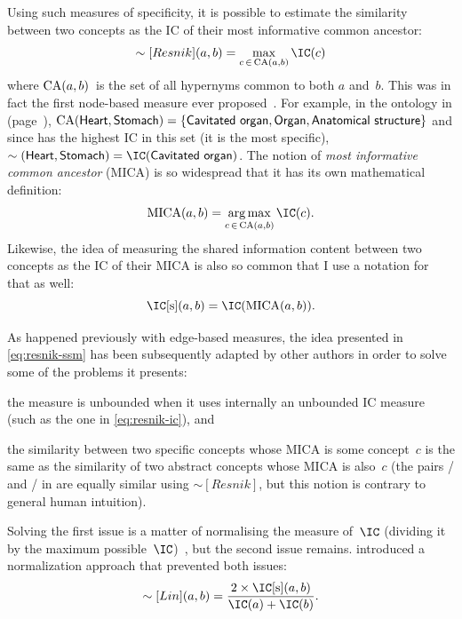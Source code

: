 Using such measures of specificity, it is possible to estimate the similarity between two concepts as the IC of their most informative common ancestor:
\begin{equation}
    \sim[Resnik](a,b) = \max_{c\,\in\,\CA(a,b)} \IC(c)
    \label{eq:resnik-ssm}
\end{equation}
where $\operatorname{CA}(a,b)$~is the set of all hypernyms common to both $a$ and~$b$. This was in fact the first node-based measure ever proposed~\citep{Resnik1995}. For example, in the ontology in  (page~\pageref{fig:anatomy-ontology}), $\operatorname{CA}(\protect\textsf{Heart}, \protect\textsf{Stomach}) = \{\protect\textsf{Cavitated organ}, \protect\textsf{Organ}, \protect\textsf{Anatomical structure}\}$ and since  has the highest IC in this set (it is the most specific), $\sim(\term{Heart},\term{Stomach}) = \IC(\term{Cavitated organ})$. The notion of \emph{most informative common ancestor} (MICA) is so widespread that it has its own mathematical definition:
\begin{equation}
    \MICA(a,b) = \argmax_{c \, \in \, \CA(a,b)} \IC(c).
    \label{eq:mica}
\end{equation}
Likewise, the idea of measuring the shared information content between two concepts as the IC of their MICA is also so common that I use a notation for that as well:
\begin{equation}
    \ICs(a,b) = \IC(\MICA(a,b)).
    \label{eq:shared-ic}
\end{equation}

As happened previously with edge-based measures, the idea presented in \eqref{eq:resnik-ssm} has been subsequently adapted by other authors in order to solve some of the problems it presents:
\begin{paralist}
    \item the measure is unbounded when it uses internally an unbounded IC measure (such as the one in \eqref{eq:resnik-ic}), and
    \item the similarity between two specific concepts whose MICA is some concept~$c$ is the same as the similarity of two abstract concepts whose MICA is also~$c$ (\eg the pairs \slash{} and \slash{} in  are equally similar using $\sim[Resnik]$, but this notion is contrary to general human intuition).
\end{paralist}
Solving the first issue is a matter of normalising the measure of~$\IC$ (\eg dividing it by the maximum possible~$\IC$)~\citep{Pesquita2008}, but the second issue remains. \citet{Lin1998} introduced a normalization approach that prevented both issues:
\begin{equation}
    \sim[Lin](a, b) = \frac{2 \times \ICs(a,b)}{\IC(a) + \IC(b)}.
    \label{eq:lin}
\end{equation}

